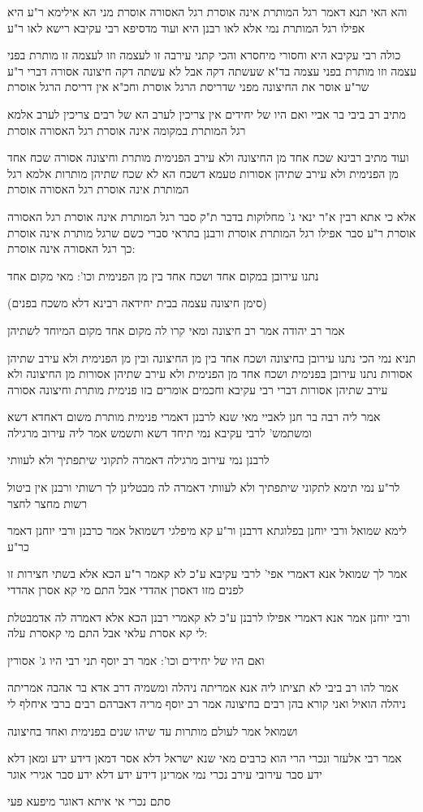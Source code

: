 \documentclass[12pt, openany]{book}
\newcommand{\sethebfont}{
\fontsize{10.5pt}{21.0pt} \selectfont
}
\newcommand{\textblock}[1]{
{\sethebfont #1\\}	
}
\begin{document}
\textblock{והא האי תנא דאמר רגל המותרת אינה אוסרת רגל האסורה אוסרת מני הא אילימא ר"ע היא אפילו רגל המותרת נמי אלא לאו רבנן היא ועוד מדסיפא רבי עקיבא רישא לאו ר"ע}
\textblock{כולה רבי עקיבא היא וחסורי מיחסרא והכי קתני עירבה זו לעצמה וזו לעצמה זו מותרת בפני עצמה וזו מותרת בפני עצמה בד"א שעשתה דקה אבל לא עשתה דקה חיצונה אסורה דברי ר"ע שר"ע אוסר את החיצונה מפני שדריסת הרגל אוסרת וחכ"א אין דריסת הרגל אוסרת}
\textblock{מתיב רב ביבי בר אביי ואם היו של יחידים אין צריכין לערב הא של רבים צריכין לערב אלמא רגל המותרת במקומה אינה אוסרת רגל האסורה אוסרת}
\textblock{ועוד מתיב רבינא שכח אחד מן החיצונה ולא עירב הפנימית מותרת וחיצונה אסורה שכח אחד מן הפנימית ולא עירב שתיהן אסורות טעמא דשכח הא לא שכח שתיהן מותרות אלמא רגל המותרת אינה אוסרת רגל האסורה אוסרת}
\textblock{אלא כי אתא רבין א"ר ינאי ג' מחלוקות בדבר ת"ק סבר רגל המותרת אינה אוסרת רגל האסורה אוסרת ר"ע סבר אפילו רגל המותרת אוסרת ורבנן בתראי סברי כשם שרגל מותרת אינה אוסרת כך רגל האסורה אינה אוסרת:}
\textblock{נתנו עירובן במקום אחד ושכח אחד בין מן הפנימית וכו': מאי מקום אחד}
\textblock{(סימן חיצונה עצמה בבית יחידאה רבינא דלא משכח בפנים)}
\textblock{אמר רב יהודה אמר רב חיצונה ומאי קרו לה מקום אחד מקום המיוחד לשתיהן}
\textblock{תניא נמי הכי נתנו עירובן בחיצונה ושכח אחד בין מן החיצונה ובין מן הפנימית ולא עירב שתיהן אסורות נתנו עירובן בפנימית ושכח אחד מן הפנימית ולא עירב שתיהן אסורות מן החיצונה ולא עירב שתיהן אסורות דברי רבי עקיבא וחכמים אומרים בזו פנימית מותרת וחיצונה אסורה}
\textblock{אמר ליה רבה בר חנן לאביי מאי שנא לרבנן דאמרי פנימית מותרת משום דאחדא דשא ומשתמש' לרבי עקיבא נמי תיחד דשא ותשמש אמר ליה עירוב מרגילה}
\textblock{לרבנן נמי עירוב מרגילה דאמרה לתקוני שיתפתיך ולא לעוותי}
\textblock{לר"ע נמי תימא לתקוני שיתפתיך ולא לעוותי דאמרה לה מבטלינן לך רשותי ורבנן אין ביטול רשות מחצר לחצר}
\textblock{לימא שמואל ורבי יוחנן בפלוגתא דרבנן ור"ע קא מיפלגי דשמואל אמר כרבנן ורבי יוחנן דאמר כר"ע}
\textblock{אמר לך שמואל אנא דאמרי אפי' לרבי עקיבא ע"כ לא קאמר ר"ע הכא אלא בשתי חצירות זו לפנים מזו דאסרן אהדדי אבל התם מי קא אסרן אהדדי}
\textblock{ורבי יוחנן אמר אנא דאמרי אפילו לרבנן ע"כ לא קאמרי רבנן הכא אלא דאמרה לה אדמבטלת לי קא אסרת עלאי אבל התם מי קאסרת עלה:}
\textblock{ואם היו של יחידים וכו': אמר רב יוסף תני רבי היו ג' אסורין}
\textblock{אמר להו רב ביבי לא תציתו ליה אנא אמריתה ניהלה ומשמיה דרב אדא בר אהבה אמריתה ניהלה הואיל ואני קורא בהן רבים בחיצונה אמר רב יוסף מריה דאברהם רבים ברבי איחלף לי}
\textblock{ושמואל אמר לעולם מותרות עד שיהו שנים בפנימית ואחד בחיצונה}
\textblock{אמר רבי אלעזר ונכרי הרי הוא כרבים מאי שנא ישראל דלא אסר דמאן דידע ידע ומאן דלא ידע סבר עירובי עירב נכרי נמי אמרינן דידע ידע דלא ידע סבר אגירי אוגר}
\textblock{סתם נכרי אי איתא דאוגר מיפעא פעי}
\end{document}
